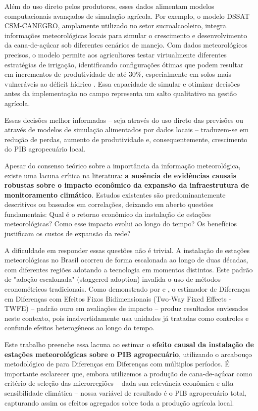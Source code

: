 \documentclass[
	12pt,				%
	oneside,			%
	a4paper,			%
	english,			%
	french,				%
	spanish,			%
	brazil				%
	]{abntex2}
\begin{document}
Além do uso direto pelos produtores, esses dados alimentam modelos computacionais avançados de simulação agrícola. Por exemplo, o modelo DSSAT CSM-CANEGRO, amplamente utilizado no setor sucroalcooleiro, integra informações meteorológicas locais para simular o crescimento e desenvolvimento da cana-de-açúcar sob diferentes cenários de manejo. Com dados meteorológicos precisos, o modelo permite aos agricultores testar virtualmente diferentes estratégias de irrigação, identificando configurações ótimas que podem resultar em incrementos de produtividade de até 30\%, especialmente em solos mais vulneráveis ao déficit hídrico \cite{vianna2016}. Essa capacidade de simular e otimizar decisões antes da implementação no campo representa um salto qualitativo na gestão agrícola.

Essas decisões melhor informadas – seja através do uso direto das previsões ou através de modelos de simulação alimentados por dados locais – traduzem-se em redução de perdas, aumento de produtividade e, consequentemente, crescimento do PIB agropecuário local.

Apesar do consenso teórico sobre a importância da informação meteorológica, existe uma lacuna crítica na literatura: \textbf{a ausência de evidências causais robustas sobre o impacto econômico da expansão da infraestrutura de monitoramento climático}. Estudos existentes são predominantemente descritivos ou baseados em correlações, deixando em aberto questões fundamentais: Qual é o retorno econômico da instalação de estações meteorológicas? Como esse impacto evolui ao longo do tempo? Os benefícios justificam os custos de expansão da rede?

A dificuldade em responder essas questões não é trivial. A instalação de estações meteorológicas no Brasil ocorreu de forma escalonada ao longo de duas décadas, com diferentes regiões adotando a tecnologia em momentos distintos. Este padrão de "adoção escalonada" (staggered adoption) invalida o uso de métodos econométricos tradicionais. Como demonstrado por  e , o estimador de Diferenças em Diferenças com Efeitos Fixos Bidimensionais (Two-Way Fixed Effects - TWFE) – padrão ouro em avaliações de impacto – produz resultados enviesados neste contexto, pois inadvertidamente usa unidades já tratadas como controles e confunde efeitos heterogêneos ao longo do tempo.

Este trabalho preenche essa lacuna ao estimar o \textbf{efeito causal da instalação de estações meteorológicas sobre o PIB agropecuário}, utilizando o arcabouço metodológico de  para Diferenças em Diferenças com múltiplos períodos. É importante esclarecer que, embora utilizemos a produção de cana-de-açúcar como critério de seleção das microrregiões – dada sua relevância econômica e alta sensibilidade climática – nossa variável de resultado é o PIB agropecuário total, capturando assim os efeitos agregados sobre toda a produção agrícola local. 
\end{document}
